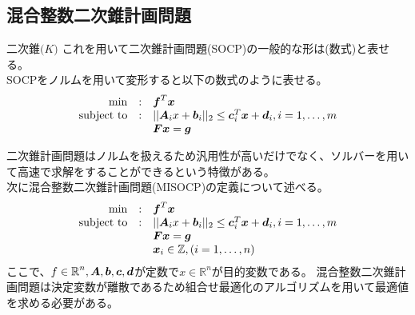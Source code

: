 \documentclass[11pt,a4paper,dvipdfmx,titlepage,uplatex]{jsarticle}
\theoremstyle{mystyle}
\newcommand{\0}{\mathbf{0}}
\def\b{\mbox{\boldmath $b$}}
\def\c{\mbox{\boldmath $c$}}
\def\d{\mbox{\boldmath $d$}}
\def\f{\mbox{\boldmath $f$}}
\def\g{\mbox{\boldmath $g$}}
\def\x{\mbox{\boldmath $x$}}
\def\A{\mbox{\boldmath $A$}}
\def\F{\mbox{\boldmath $F$}}
\def\Real{\mbox{$\mathbb{R}$}}
\begin{document}
\subsection{混合整数二次錐計画問題}\label{sec:Second_Order_Cone_Programming}
二次錐$\mathcal(K)$
これを用いて二次錐計画問題(SOCP)の一般的な形は(数式)と表せる。\\
SOCPをノルムを用いて変形すると以下の数式のように表せる。\\
\begin{align}
	\begin{array}{rcl}
		\min & : & \f ^T\x \\
		\text{subject to} & : &||\A_i x +\b_i||_2 \leq \c_i^T\x+\d_i, i = 1,\dots, m \\
		& & \F\x=\g\\
	\end{array}
\end{align}

二次錐計画問題はノルムを扱えるため汎用性が高いだけでなく、ソルバーを用いて高速で求解をすることができるという特徴がある。\\
次に混合整数二次錐計画問題(MISOCP)の定義について述べる。\\
\begin{align}
	\begin{array}{rcl}
		\min & : & \f ^T\x \\
		\text{subject to} & : &||\A_i x +\b_i||_2 \leq \c_i^T\x+\d_i, i = 1,\dots, m \\
		& & \F\x=\g\\
		& & \x_i \in \mathbb{Z}, (i=1,\dots, n)
	\end{array}
\end{align}
ここで、$f \in \Real^n , \A, \b, \c, \d$が定数で$x \in \Real^n$が目的変数である。
混合整数二次錐計画問題は決定変数が離散であるため組合せ最適化のアルゴリズムを用いて最適値を求める必要がある。
\end{document}

